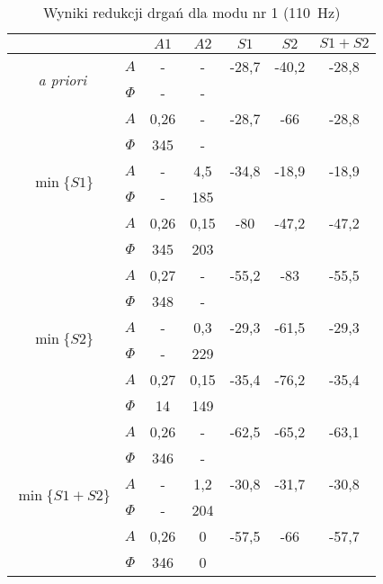 \documentclass[polish,a4paper,11pt]{mwart}
\begin{document}
  \begin{table}[!tbh]
    \centering
    \caption{Wyniki redukcji drgań dla modu nr 1 (\SI{110}{\hertz})}
    \label{tab:red1}
    \begin{tabular}{|c|c|c|c|c|c|c|}
      \cline{3-7}
      \multicolumn{2}{c|}{}&$A1$&$A2$&$S1$&$S2$&$S1+S2$\\\hline
      \multirow{2}{*}{\textit{a priori}} & $A$ & - & - & -28,7 & -40,2 & -28,8\\\cline{2-7}
					 & $\Phi$ & - & - & \multicolumn{3}{c}{}\\\hline
      \multirow{6}{*}{$\min\{S1\}$}   &   $A$ & 0,26 & - & -28,7 & -66 & -28,8\\\cline{2-7}
				      &$\Phi$ & 345 & - & \multicolumn{3}{c}{}\\\cline{2-7}
				      &   $A$ & - & 4,5 & -34,8 & -18,9 & -18,9\\\cline{2-7}
				      &$\Phi$ & - & 185 & \multicolumn{3}{c}{}\\\cline{2-7}
				      &   $A$ & 0,26 & 0,15 & -80 & -47,2 & -47,2\\\cline{2-7}
				      &$\Phi$ & 345 & 203 & \multicolumn{3}{c}{}\\\hline
      \multirow{6}{*}{$\min\{S2\}$}   &   $A$ & 0,27 & - & -55,2 & -83 & -55,5\\\cline{2-7}
				      &$\Phi$ & 348 & - & \multicolumn{3}{c}{}\\\cline{2-7}
				      &   $A$ & - & 0,3 & -29,3 & -61,5 & -29,3\\\cline{2-7}
				      &$\Phi$ & - & 229 & \multicolumn{3}{c}{}\\\cline{2-7}
				      &   $A$ & 0,27 & 0,15 & -35,4 & -76,2 & -35,4\\\cline{2-7}
				      &$\Phi$ & 14 & 149 & \multicolumn{3}{c}{}\\\hline
      \multirow{6}{*}{$\min\{S1+S2\}$}&   $A$ & 0,26 & - & -62,5 & -65,2 & -63,1\\\cline{2-7}
				      &$\Phi$ & 346 & - & \multicolumn{3}{c}{}\\\cline{2-7}
				      &   $A$ & - & 1,2 & -30,8 & -31,7 & -30,8\\\cline{2-7}
				      &$\Phi$ & - & 204 & \multicolumn{3}{c}{}\\\cline{2-7}
				      &   $A$ & 0,26 & 0 & -57,5 & -66 & -57,7\\\cline{2-7}
				      &$\Phi$ & 346 & 0 & \multicolumn{3}{c}{}\\\cline{1-4}
    \end{tabular}
  \end{table}
\end{document}
